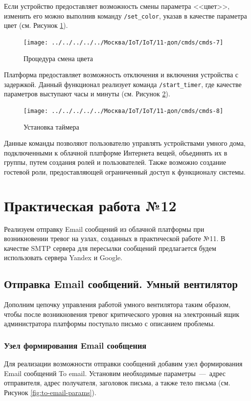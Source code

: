 \documentclass[a4paper,14pt]{extarticle}
\begin{document}
Если устройство предоставляет возможность смены параметра <<цвет>>, изменить его можно выполнив команду \texttt{/set\_color}, указав в качестве параметра цвет (см. Рисунок \ref{fig:cmds-7}). 

\begin{figure}[h!]
	\centering
	\texttt{[image: ../../../../../Москва/IoT/IoT/11-доп/cmds/cmds-7]}
	\caption{Процедура смена цвета}
	\label{fig:cmds-7}
\end{figure}


Платформа предоставляет возможность отключения и включения устройства с задержкой. Данный функционал реализует команда \texttt{/start\_timer}, где качестве параметров выступают часы и минуты (см. Рисунок \ref{fig:cmds-8}). 
\begin{figure}[h!]
	\centering
	\texttt{[image: ../../../../../Москва/IoT/IoT/11-доп/cmds/cmds-8]}
	\caption{Установка таймера}
	\label{fig:cmds-8}
\end{figure}
\newpage
Данные команды позволяют пользователю управлять устройствами умного дома, подключенными к облачной платформе Интернета вещей, объединять их в группы, путем создания ролей и пользователей. Также возможно создание гостевой роли, предоставляющей ограниченный доступ к функционалу системы.


\section{Практическая работа №12}
Реализуем отправку Email сообщений из облачной платформы при возникновении тревог на узлах, созданных в практической работе №11.
В качестве SMTP сервера для пересылки
сообщений предлагается будем использовать сервера Yandex и Google.

\subsection{Отправка Email сообщений. Умный вентилятор}

Дополним цепочку управления работой умного вентилятора таким образом, чтобы после возникновения тревог критического уровня на электронный ящик администратора платформы поступало письмо с описанием проблемы.
\subsubsection*{Узел формирования Email сообщения}
\label{sec:to-email}
Для реализации возможности отправки сообщений добавим узел формирования Email сообщений To email. Установим необходимые параметры~---~адрес отправителя, адрес получателя, заголовок письма, а также тело письма (см. Рисунок \ref{fig:to-email-params}).
\end{document}
